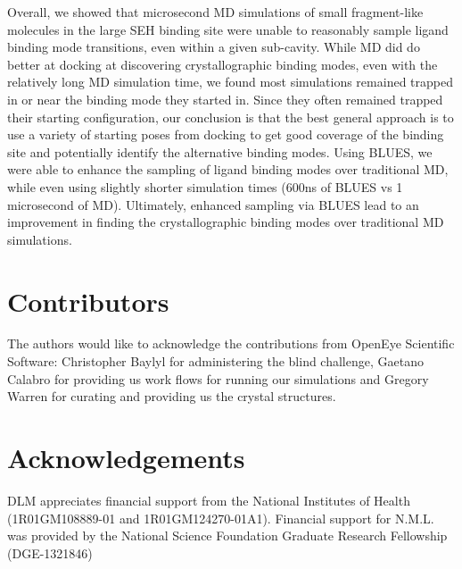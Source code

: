 Overall, we showed that microsecond MD simulations of small fragment-like molecules in the large SEH binding site were unable to reasonably sample ligand binding mode transitions, even within a given sub-cavity.
While MD did do better at docking at discovering crystallographic binding modes, even with the relatively long MD simulation time, we found most simulations remained trapped in or near the binding mode they started in.
Since they often remained trapped their starting configuration, our conclusion is that the best general approach is to use a variety of starting poses from docking to get good coverage of the binding site and potentially identify the alternative binding modes.
Using BLUES, we were able to enhance the sampling of ligand binding modes over traditional MD, while even using slightly shorter simulation times (600ns of BLUES vs 1 microsecond of MD).
Ultimately, enhanced sampling via BLUES lead to an improvement in finding the crystallographic binding modes over traditional MD simulations.

\section{Contributors}
The authors would like to acknowledge the contributions from OpenEye Scientific Software: Christopher Baylyl for administering the blind challenge, Gaetano Calabro for providing us work flows for running our simulations and Gregory Warren for curating and providing us the crystal structures.

\section{Acknowledgements}
DLM appreciates financial support from the National Institutes of Health (1R01GM108889-01 and 1R01GM124270-01A1). Financial support for N.M.L. was provided by the National Science Foundation Graduate Research Fellowship (DGE-1321846)

